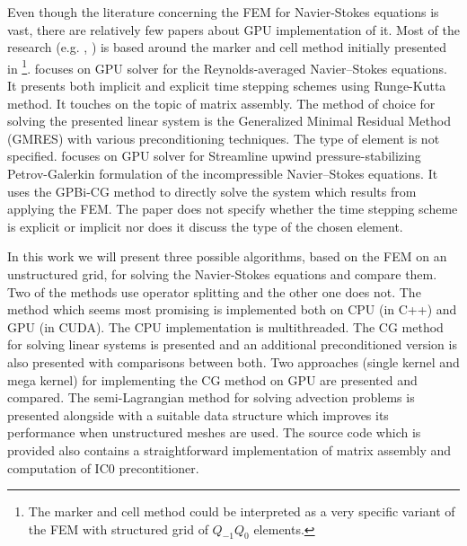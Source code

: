 Even though the literature concerning the FEM for Navier-Stokes equations is vast, there are relatively few papers about GPU implementation of it. Most of the research (e.g. \cite{GPU-Gems}, \cite{MAC-Grid-Paper}) is based around the marker and cell method initially presented in \cite{MAC-Grid-Original} \footnote{The marker and cell method could be interpreted as a very specific variant of the FEM with structured grid of $Q_{-1}Q_0$ elements.}. \cite{phdthesis-navierstokes} focuses on GPU solver for the Reynolds-averaged Navier–Stokes equations. It presents both implicit and explicit time stepping schemes using Runge-Kutta method. It touches on the topic of matrix assembly. The method of choice for solving the presented linear system is the Generalized Minimal Residual Method (GMRES) with various preconditioning techniques. The type of element is not specified. \cite{navierstokes} focuses on GPU solver for Streamline upwind pressure-stabilizing Petrov-Galerkin formulation of the incompressible Navier–Stokes equations. It uses the GPBi-CG method to directly solve the system which results from applying the FEM. The paper does not specify whether the time stepping scheme is explicit or implicit nor does it discuss the type of the chosen element.

In this work we will present three possible algorithms, based on the FEM on an unstructured grid, for solving the Navier-Stokes equations and compare them. Two of the methods use operator splitting and the other one does not. The method which seems most promising is implemented both on CPU (in C++) and GPU (in CUDA). The CPU implementation is multithreaded. The CG method for solving linear systems is presented and an additional preconditioned version is also presented with comparisons between both. Two approaches (single kernel and mega kernel) for implementing the CG method on GPU are presented and compared. The semi-Lagrangian method for solving advection problems is presented alongside with a suitable data structure which improves its performance when unstructured meshes are used. The source code which is provided also contains a straightforward implementation of matrix assembly and computation of IC0 precontitioner.

